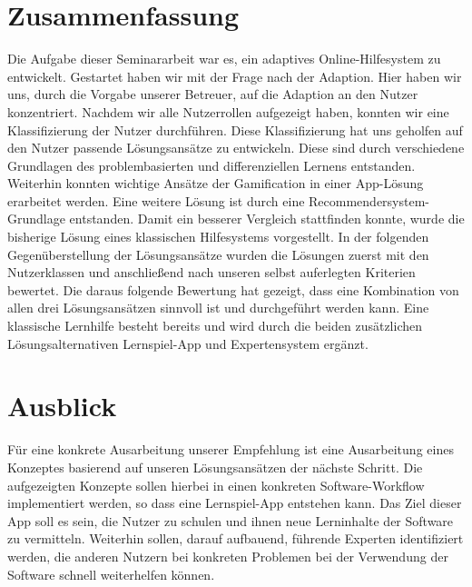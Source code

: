 \chapter{Zusammenfassung}
Die Aufgabe dieser Seminararbeit war es, ein adaptives Online-Hilfesystem zu entwickelt. Gestartet haben wir mit der Frage nach der Adaption. Hier haben wir uns, durch die Vorgabe unserer Betreuer, auf die Adaption an den Nutzer konzentriert. Nachdem wir alle Nutzerrollen aufgezeigt haben, konnten wir eine Klassifizierung der Nutzer durchführen. Diese Klassifizierung hat uns geholfen auf den Nutzer passende Lösungsansätze zu entwickeln. Diese sind durch verschiedene Grundlagen des problembasierten und differenziellen Lernens entstanden. Weiterhin konnten wichtige Ansätze der Gamification in einer App-Lösung erarbeitet werden. Eine weitere Lösung ist durch eine Recommendersystem-Grundlage entstanden. Damit ein besserer Vergleich stattfinden konnte, wurde die bisherige Lösung eines klassischen Hilfesystems vorgestellt. In der folgenden Gegenüberstellung der Lösungsansätze wurden die Lösungen zuerst mit den Nutzerklassen und anschließend nach unseren selbst auferlegten Kriterien bewertet. Die daraus folgende Bewertung hat gezeigt, dass eine Kombination von allen drei Lösungsansätzen sinnvoll ist und durchgeführt werden kann. Eine klassische Lernhilfe besteht bereits und wird durch die beiden zusätzlichen Lösungsalternativen Lernspiel-App und Expertensystem ergänzt.

\chapter{Ausblick}
Für eine konkrete Ausarbeitung unserer Empfehlung ist eine Ausarbeitung eines Konzeptes basierend auf unseren Lösungsansätzen der nächste Schritt. Die aufgezeigten Konzepte sollen hierbei in einen konkreten Software-Workflow implementiert werden, so dass eine Lernspiel-App entstehen kann. Das Ziel dieser App soll es sein, die Nutzer zu schulen und ihnen neue Lerninhalte der Software zu vermitteln. Weiterhin sollen, darauf aufbauend, führende Experten identifiziert werden, die anderen Nutzern bei konkreten Problemen bei der Verwendung der Software schnell weiterhelfen können.


